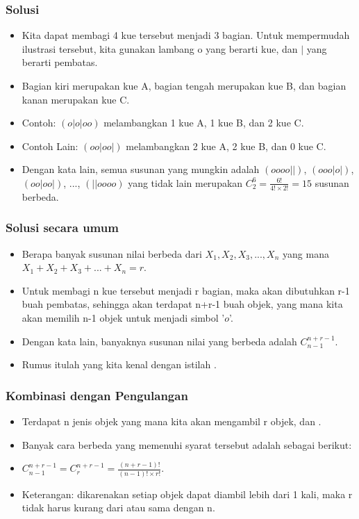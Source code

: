 \begin{frame}
\frametitle{Solusi}
\begin{itemize}
  \item Kita dapat membagi 4 kue tersebut menjadi 3 bagian. Untuk mempermudah ilustrasi tersebut, kita gunakan lambang o yang berarti kue, dan $|$ yang berarti pembatas.
  \item Bagian kiri merupakan kue A, bagian tengah merupakan kue B, dan bagian kanan merupakan kue C.
  \item Contoh: $(o|o|oo)$ melambangkan 1 kue A, 1 kue B, dan 2 kue C.
  \item Contoh Lain: $(oo|oo|)$ melambangkan 2 kue A, 2 kue B, dan 0 kue C.
  \item Dengan kata lain, semua susunan yang mungkin adalah $(oooo||)$, $(ooo|o|)$, $(oo|oo|)$, ..., $(||oooo)$ yang tidak lain merupakan $C^{6}_{2} = \frac{6!}{4! \times 2!} = 15$ susunan berbeda.
\end{itemize}
\end{frame}

\begin{frame}
\frametitle{Solusi secara umum}
\begin{itemize}
  \item Berapa banyak susunan nilai berbeda dari $X_{1}, X_{2}, X_{3}, ..., X_{n}$ yang mana $X_{1} + X_{2} + X_{3} + ... + X_{n} = r$.
  \item Untuk membagi n kue tersebut menjadi r bagian, maka akan dibutuhkan r-1 buah pembatas, sehingga akan terdapat n+r-1 buah objek, yang mana kita akan memilih n-1 objek untuk menjadi simbol '$o$'.
  \item Dengan kata lain, banyaknya susunan nilai yang berbeda adalah $C^{n+r-1}_{n-1}$.
  \item Rumus itulah yang kita kenal dengan istilah .
\end{itemize}
\end{frame}

\begin{frame}
\frametitle{Kombinasi dengan Pengulangan}
\begin{itemize}
  \item Terdapat n jenis objek yang mana kita akan mengambil r objek, dan .
  \item Banyak cara berbeda yang memenuhi syarat tersebut adalah sebagai berikut:
  \item $C^{n+r-1}_{n-1} = C^{n+r-1}_{r} = \frac{(n+r-1)!}{(n-1)! \times r!}$.
  \item Keterangan: dikarenakan setiap objek dapat diambil lebih dari 1 kali, maka r tidak harus kurang dari atau sama dengan n.
\end{itemize}
\end{frame}

